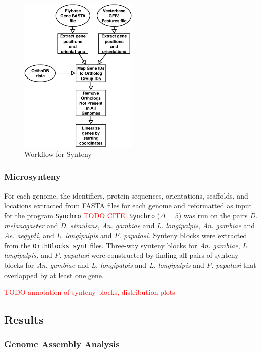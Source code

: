 \begin{figure}[H]
  \centering
  \includegraphics[width=0.5\textwidth]{figures/synteny/orthodb_dotplot_workflow}
  \caption{Workflow for Synteny}
  \label{fig:synteny-workflow}
\end{figure}

\subsubsection{Microsynteny}
For each genome, the identifiers, protein sequences, orientations, scaffolds, and locations extracted from FASTA files for each genome and reformatted as input for the program \texttt{Synchro} \textcolor{red}{TODO CITE}.  \texttt{Synchro} ($\Delta=5$) was run on the pairs \emph{D. melanogaster} and \emph{D. simulans}, \emph{An. gambiae} and \emph{L. longipalpis}, \emph{An. gambiae} and \emph{Ae. aegypti}, and \emph{L. longipalpis} and \emph{P. papatasi}.  Synteny blocks were extracted from the \texttt{OrthBlocks synt} files.  Three-way synteny blocks for \emph{An. gambiae}, \emph{L. longipalpis}, and \emph{P. papatasi} were constructed by finding all pairs of synteny blocks for \emph{An. gambiae} and \emph{L. longipalpis} and \emph{L. longipalpis} and \emph{P. papatasi} that overlapped by at least one gene.  

\textcolor{red}{TODO annotation of synteny blocks, distribution plots}


\subsection{Results}

\subsubsection{Genome Assembly Analysis}

